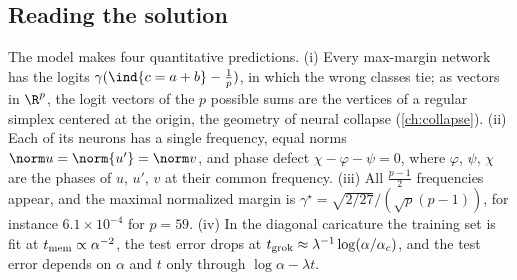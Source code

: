\begin{refsection}
\section{Reading the solution}\label{sec:grokking:reading}

The model makes four quantitative predictions. (i) Every max-margin network has the logits $\gamma(\ind\{c=a+b\}-\frac1p)$, in which the wrong classes tie; as vectors in $\R^p$, the logit vectors of the $p$ possible sums are the vertices of a regular simplex centered at the origin, the geometry of neural collapse (\cref{ch:collapse}). (ii) Each of its neurons has a single frequency, equal norms $\norm u=\norm{u'}=\norm v$, and phase defect $\chi-\varphi-\psi=0$, where $\varphi$, $\psi$, $\chi$ are the phases of $u$, $u'$, $v$ at their common frequency. (iii) All $\frac{p-1}2$ frequencies appear, and the maximal normalized margin is $\gamma^\star=\sqrt{2/27}/(\sqrt p(p-1))$, for instance $6.1\times10^{-4}$ for $p=59$. (iv) In the diagonal caricature the training set is fit at $t_{\mathrm{mem}}\propto\alpha^{-2}$, the test error drops at $t_{\mathrm{grok}}\approx\lambda^{-1}\log(\alpha/\alpha_c)$, and the test error depends on $\alpha$ and $t$ only through $\log\alpha-\lambda t$.


\end{refsection}
